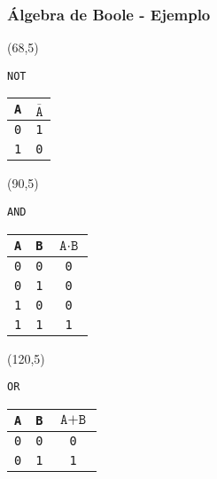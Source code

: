\documentclass[aspectratio=169]{beamer}
\begin{document}
\begin{frame}[fragile,t]
    \frametitle{Álgebra de Boole - Ejemplo}
    \begin{textblock}{16}(68,5)
    \begin{block}{\texttt{NOT}}
    \begin{tabular}{c|c}
    \texttt{A} & \textcolor{naranjauca}{ $\overline{\texttt{A}}$} \\
    \hline
    \texttt{0} & \texttt{1} \\
    \texttt{1} & \texttt{0} \\
    \end{tabular}
    \end{block}
    \end{textblock}
    \begin{textblock}{24}(90,5)
    \begin{block}{\texttt{AND}}
    \begin{tabular}{cc|c}
    \texttt{A} & \texttt{B} & \textcolor{naranjauca}{ $\texttt{A}\cdot\texttt{B}$} \\
    \hline
    \texttt{0} & \texttt{0} & \texttt{0} \\
    \texttt{0} & \texttt{1} & \texttt{0} \\
    \texttt{1} & \texttt{0} & \texttt{0} \\
    \texttt{1} & \texttt{1} & \texttt{1} \\
    \end{tabular}
    \end{block}
    \end{textblock}
    \begin{textblock}{25}(120,5)
    \begin{block}{\texttt{OR}}
    \begin{tabular}{cc|c}
    \texttt{A} & \texttt{B} & \textcolor{naranjauca}{ $\texttt{A}+\texttt{B}$} \\
    \hline
    \texttt{0} & \texttt{0} & \texttt{0} \\
    \texttt{0} & \texttt{1} & \texttt{1} \\

\end{tabular}
\end{block}
\end{textblock}
\end{frame}
\end{document}
